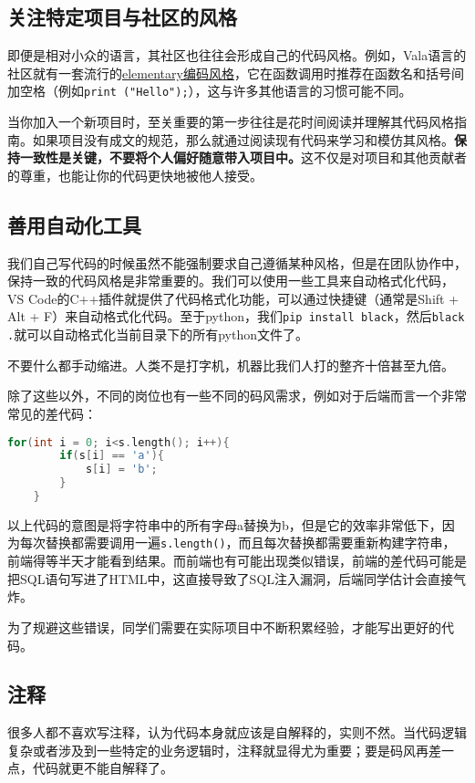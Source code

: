 \subsection{关注特定项目与社区的风格}
即便是相对小众的语言，其社区也往往会形成自己的代码风格。例如，Vala语言的社区就有一套流行的\href{https://docs.elementary.io/develop/writing-apps/code-style}{elementary编码风格}，它在函数调用时推荐在函数名和括号间加空格（例如\texttt{print ("Hello");}），这与许多其他语言的习惯可能不同。

当你加入一个新项目时，至关重要的第一步往往是花时间阅读并理解其代码风格指南。如果项目没有成文的规范，那么就通过阅读现有代码来学习和模仿其风格。\textbf{保持一致性是关键，不要将个人偏好随意带入项目中。}这不仅是对项目和其他贡献者的尊重，也能让你的代码更快地被他人接受。

\subsection{善用自动化工具}
我们自己写代码的时候虽然不能强制要求自己遵循某种风格，但是在团队协作中，保持一致的代码风格是非常重要的。我们可以使用一些工具来自动格式化代码，VS Code的C++插件就提供了代码格式化功能，可以通过快捷键（通常是Shift + Alt + F）来自动格式化代码。至于python，我们\texttt{pip install black}，然后\texttt{black .}就可以自动格式化当前目录下的所有python文件了。

不要什么都手动缩进。人类不是打字机，机器比我们人打的整齐十倍甚至九倍。

除了这些以外，不同的岗位也有一些不同的码风需求，例如对于后端而言一个非常常见的差代码：
\begin{lstlisting}[language=C++]
    for(int i = 0; i<s.length(); i++){
        if(s[i] == 'a'){
            s[i] = 'b';
        }
    }
\end{lstlisting}
以上代码的意图是将字符串中的所有字母a替换为b，但是它的效率非常低下，因为每次替换都需要调用一遍\texttt{s.length()}，而且每次替换都需要重新构建字符串，前端得等半天才能看到结果。而前端也有可能出现类似错误，前端的差代码可能是把SQL语句写进了HTML中，这直接导致了SQL注入漏洞，后端同学估计会直接气炸。

为了规避这些错误，同学们需要在实际项目中不断积累经验，才能写出更好的代码。

\subsection{注释}

很多人都不喜欢写注释，认为代码本身就应该是自解释的，实则不然。当代码逻辑复杂或者涉及到一些特定的业务逻辑时，注释就显得尤为重要；要是码风再差一点，代码就更不能自解释了。

